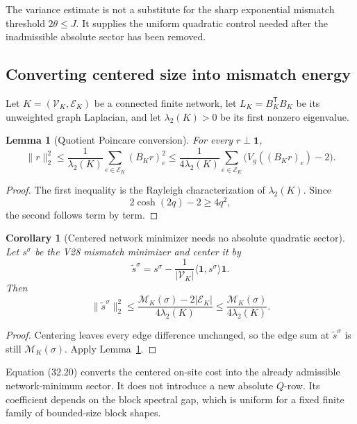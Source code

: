 \documentclass[11pt]{article}
\newtheorem{lemma}[theorem]{Lemma}
\newtheorem{corollary}[theorem]{Corollary}
\theoremstyle{remark}
\begin{document}
The variance estimate is not a substitute for the sharp exponential
mismatch threshold \(2\theta\leq J\).  It supplies the uniform quadratic
control needed after the inadmissible absolute sector has been removed.

\subsection{Converting centered size into mismatch energy}

Let \(K=(\mathcal V_K,\mathcal E_K)\) be a connected finite network,
let \(L_K=B_K^{\mathsf T}B_K\) be its unweighted graph Laplacian, and
let \(\lambda_2(K)>0\) be its first nonzero eigenvalue.

\begin{lemma}[Quotient Poincare conversion]
\label{lem:v17v32-poincare}
For every \(r\perp\mathbf1\),
\[
 \|r\|_2^2
 \leq\frac{1}{\lambda_2(K)}\sum_{e\in\mathcal E_K}(B_Kr)_e^2
 \leq\frac{1}{4\lambda_2(K)}
 \sum_{e\in\mathcal E_K}\bigl(V_g((B_Kr)_e)-2\bigr).          \tag{32.17}
\]
\end{lemma}

\begin{proof}
The first inequality is the Rayleigh characterization of
\(\lambda_2(K)\).  Since
\[
 2\cosh(2q)-2\geq4q^2,                             \tag{32.18}
\]
the second follows term by term.
\end{proof}

\begin{corollary}[Centered network minimizer needs no absolute
quadratic sector]
\label{cor:v17v32-minimizer}
Let \(s^\sigma\) be the V28 mismatch minimizer and center it by
\[
 \widetilde s^\sigma
 =s^\sigma-\frac1{|\mathcal V_K|}
 \langle\mathbf1,s^\sigma\rangle\mathbf1.         \tag{32.19}
\]
Then
\[
 \|\widetilde s^\sigma\|_2^2
 \leq\frac{
 \mathcal M_K(\sigma)-2|\mathcal E_K|}
 {4\lambda_2(K)}
 \leq\frac{\mathcal M_K(\sigma)}{4\lambda_2(K)}. \tag{32.20}
\]
\end{corollary}

\begin{proof}
Centering leaves every edge difference unchanged, so the edge sum at
\(\widetilde s^\sigma\) is still \(\mathcal M_K(\sigma)\).  Apply
Lemma~\ref{lem:v17v32-poincare}.
\end{proof}

Equation (32.20) converts the centered on-site cost into the already
admissible network-minimum sector.  It does not introduce a new
absolute \(Q\)-row.  Its coefficient depends on the block spectral gap,
which is uniform for a fixed finite family of bounded-size block
shapes.
\end{document}
